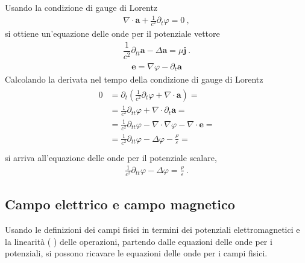 \documentclass[letterpaper,10pt,english]{jupyterBook}
\begin{document}
\sphinxAtStartPar
Usando la condizione di gauge di Lorentz
\begin{equation*}
\begin{split}\nabla \cdot \mathbf{a} + \frac{1}{c^2} \partial_t  \varphi = 0 \ ,\end{split}
\end{equation*}
\sphinxAtStartPar
si ottiene un’equazione delle onde per il potenziale vettore
\begin{equation*}
\begin{split} \dfrac{1}{c^2} \partial_{tt} \mathbf{a} - \Delta \mathbf{a}  =  \mu \mathbf{j}  \ .\end{split}
\end{equation*}
\sphinxAtStartPar
{}
\begin{equation*}
\begin{split}\mathbf{e} = \nabla \varphi - \partial_t \mathbf{a}\end{split}
\end{equation*}
\sphinxAtStartPar
Calcolando la derivata nel tempo della condizione di gauge di Lorentz
\begin{equation*}
\begin{split}\begin{aligned}
 0 & = \partial_t (\frac{1}{c^2} \partial_t \varphi + \nabla \cdot \mathbf{a}) = \\
   & = \frac{1}{c^2} \partial_{tt} \varphi + \nabla \cdot \partial_t \mathbf{a} = \\
   & = \frac{1}{c^2} \partial_{tt} \varphi - \nabla \cdot \nabla \varphi - \nabla \cdot \mathbf{e} = \\
   & = \frac{1}{c^2} \partial_{tt} \varphi - \Delta \varphi - \frac{\rho}{\varepsilon} = \\
\end{aligned}\end{split}
\end{equation*}
\sphinxAtStartPar
si arriva all’equazione delle onde per il potenziale scalare,
\begin{equation*}
\begin{split} \frac{1}{c^2} \partial_{tt} \varphi - \Delta \varphi = \frac{\rho}{\varepsilon} \ .\end{split}
\end{equation*}

\subsection{Campo elettrico e campo magnetico}
\label{\detokenize{ch/waves-equation:campo-elettrico-e-campo-magnetico}}
\sphinxAtStartPar
Usando le definizioni dei campi fisici in termini dei potenziali elettromagnetici e la linearità ( ) delle operazioni, partendo dalle equazioni delle onde per i potenziali, si possono ricavare le equazioni delle onde per i campi fisici.  
\end{document}
